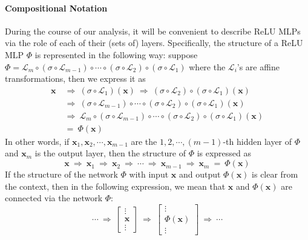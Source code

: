 \documentclass{article}
\numberwithin{equation}{section}
\theoremstyle{definition}
\begin{document}
\paragraph{Compositional Notation}
During the course of our analysis, it will be convenient to describe ReLU MLPs via the role of each of their (sets of) layers.  Specifically, the structure of a ReLU MLP $\Phi$ is represented in the following way: suppose $\Phi = \mathcal{L}_m \circ (\sigma \circ \mathcal{L}_{m-1}) \circ \cdots \circ (\sigma \circ \mathcal{L}_2) \circ (\sigma \circ \mathcal{L}_1)$ where the $\mathcal{L}_i$'s are affine transformations, then we express it as 
\begin{align*}
    \mathbf{x}
    \ &\Longrightarrow \
    (\sigma \circ \mathcal{L}_1) (\mathbf{x})
    \ \Longrightarrow \
    (\sigma \circ \mathcal{L}_2) \circ (\sigma \circ \mathcal{L}_1) (\mathbf{x})
    \\
    \ &\Longrightarrow \
    (\sigma \circ \mathcal{L}_{m-1}) \circ \cdots \circ (\sigma \circ \mathcal{L}_2) \circ (\sigma \circ \mathcal{L}_1) (\mathbf{x})
    \\
    \ &\Longrightarrow \
    \mathcal{L}_m \circ (\sigma \circ \mathcal{L}_{m-1}) \circ \cdots \circ (\sigma \circ \mathcal{L}_2) \circ (\sigma \circ \mathcal{L}_1) (\mathbf{x})
    \\
    \ &= \ \Phi(\mathbf{x})
\end{align*}
In other words, if $\mathbf{x}_1,\mathbf{x}_2,\cdots,\mathbf{x}_{m-1}$ are the $1,2,\cdots,(m-1)$-th hidden layer of $\Phi$ and $\mathbf{x}_m$ is the output layer, then the structure of $\Phi$ is expressed as 
$$\mathbf{x} \ \Longrightarrow \ 
\mathbf{x}_1 \ \Longrightarrow \
\mathbf{x}_2 \ \Longrightarrow \
\cdots \ \Longrightarrow \
\mathbf{x}_{m-1} \ \Longrightarrow \
\mathbf{x}_m
\ = \ \Phi(\mathbf{x})$$
If the structure of the network $\Phi$ with input $\mathbf{x}$ and output $\Phi(\mathbf{x})$ is clear from the context, then in the following expression, we mean that $\mathbf{x}$ and $\Phi(\mathbf{x})$ are connected via the network $\Phi$: 
\[
    \cdots
    \ \Longrightarrow \
    \begin{bmatrix}
        \vdots \\ \mathbf{x} \\ \vdots
    \end{bmatrix}
    \ \Longrightarrow \ 
    \begin{bmatrix}
        \vdots \\ \Phi(\mathbf{x}) \\ \vdots
    \end{bmatrix}
    \ \Longrightarrow \
    \cdots
\]
\end{document}
